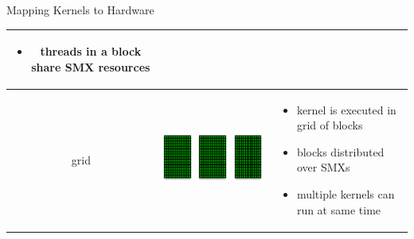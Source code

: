 \begin{frame}[fragile]{Mapping Kernels to Hardware}
\begin{center}
\begin{tabular}{|c|m{4cm}|m{5cm}|}
\begin{itemize}
            \item threads in a block share SMX resources
        \end{itemize} \\
    \hline
        grid &
        \begin{minipage}{4cm}
            \includegraphics[width=0.3\textwidth]{./images/smx.pdf}
            \includegraphics[width=0.3\textwidth]{./images/smx.pdf}
            \includegraphics[width=0.3\textwidth]{./images/smx.pdf}
        \end{minipage} &
        \footnotesize
        \begin{itemize}
            \item kernel is executed in grid of blocks
            \item blocks distributed over SMXs
            \item multiple kernels can run at same time
        \end{itemize} \\
\hline
\end{tabular}
\end{center}
\end{frame}

